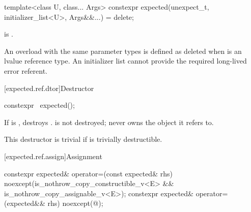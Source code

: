 %
\begin{itemdecl}
template<class U, class... Args>
  constexpr expected(unexpect_t, initializer_list<U>, Args&&...) = delete;
\end{itemdecl}

\begin{itemdescr}
\pnum
\constraints
{} is .

\pnum
\remarks
An overload with the same parameter types is defined as deleted when  is an lvalue reference type. An initializer list cannot provide the required long-lived error referent.
\end{itemdescr}

[expected.ref.dtor]{Destructor}

%
\begin{itemdecl}
constexpr ~expected();
\end{itemdecl}

\begin{itemdescr}
\pnum
\effects
If  is , destroys .  is not destroyed;  never owns the object it refers to.

\pnum
\remarks
This destructor is trivial if  is trivially destructible.
\end{itemdescr}

[expected.ref.assign]{Assignment}

%
\begin{itemdecl}
constexpr expected& operator=(const expected& rhs) noexcept(is_nothrow_copy_constructible_v<E> &&
                                                            is_nothrow_copy_assignable_v<E>);
constexpr expected& operator=(expected&& rhs) noexcept(@\seebelow@);
\end{itemdecl}

